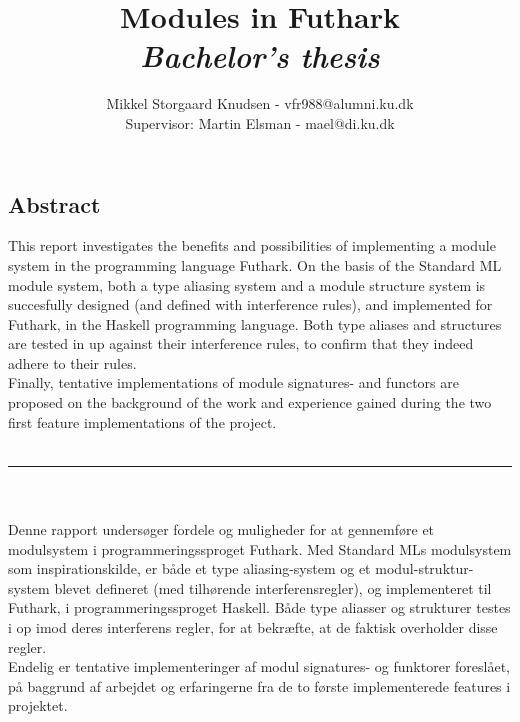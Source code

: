 \documentclass[12pt]{article}
\title{
  Modules in Futhark \\
\textit{Bachelor's thesis}
}
\author{Mikkel Storgaard Knudsen - vfr988@alumni.ku.dk \\
Supervisor: Martin Elsman - mael@di.ku.dk}
\begin{document}
\maketitle

\subsection*{Abstract}
\label{subsec:abstract}
This report investigates the benefits and possibilities of implementing a module system in the programming language Futhark. On the basis of the Standard ML module system, both a type aliasing system and a module structure system is succesfully designed (and defined with interference rules), and implemented for Futhark, in the Haskell programming language.
Both type aliases and structures are tested in up against their interference rules, to confirm that they indeed adhere to their rules.\\
Finally, tentative implementations of module signatures- and functors are proposed on the background of the work and experience gained during the two first feature implementations of the project.
\\\\
\noindent\rule{8cm}{0.4pt}
\\
\\
\small
Denne rapport undersøger fordele og muligheder for at gennemføre et modulsystem i programmeringssproget Futhark. Med Standard MLs modulsystem som inspirationskilde, er både et type aliasing-system og et modul-struktur-system blevet defineret (med tilhørende interferensregler), og implementeret til Futhark, i programmeringssproget Haskell.
Både type aliasser og strukturer testes i op imod deres interferens regler, for at bekræfte, at de faktisk overholder disse regler. \\
Endelig er tentative implementeringer af modul signatures- og funktorer foreslået, på baggrund af arbejdet og erfaringerne fra de to første implementerede features i projektet.
\normalsize
\clearpage
\tableofcontents
\clearpage

\clearpage

\clearpage

\clearpage

\clearpage

\clearpage

\end{document}
